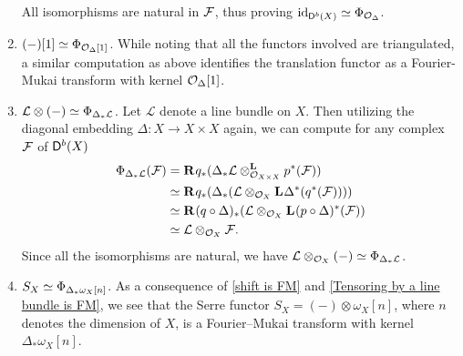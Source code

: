 \begin{example}
\begin{enumerate}[label = (\roman*)]
{    %
    All isomorphisms are natural in $\F$, thus proving $\id{\derb{X}} \iso \fm{\struct{\Delta}}$.
    }
    \item{$(-)[1] \iso \fm{\struct{\Delta}[1]}$. While noting that all the functors involved are triangulated, a similar computation as above identifies the translation functor as a Fourier-Mukai transform with kernel $\struct{\Delta}[1]$.} \label{shift is FM}
    \item{
    $\mathcal L \otimes (-) \iso \fm{\Delta_*\mathcal L}$. Let $\mathcal L$ denote a line bundle on $X$. Then utilizing the diagonal embedding $\Delta \colon X \to X \times X$ again, we can compute for any complex $\F$ of $\derb{X}$
    \begin{align*}
        \fm{{\Delta_*\mathcal L}}(\F) &= \rderived{}{q_*}(\derivedtensor{\Delta_*\mathcal L}{p^*(\F)}{\struct{X \times X}}) \\
        &\iso \rderived{}{q_*}(\Delta_*(\mathcal L \otimes_{\struct{X}}\lderived{}{\Delta^*}({q^*}(\F)))) \\
        &\iso \rderived{}{(q \circ \Delta)_*}(\mathcal L \otimes_{\struct{X}} \lderived{}{(p \circ \Delta)^*}(\F)) \\
        &\iso \mathcal L \otimes_{\struct{X}} \F.
    \end{align*}
    Since all the isomorphisms are natural, we have $\mathcal L \otimes_{\struct{X}} (-) \iso \fm{\Delta_*\mathcal L}$.
    } \label{Tensoring by a line bundle is FM}
    \item{$S_X \iso \fm{\Delta_*\omega_X[n]}$. As a consequence of \ref{shift is FM} and \ref{Tensoring by a line bundle is FM}, we see that the Serre functor $S_X = (-) \otimes \omega_X[n]$, where $n$ denotes the dimension of $X$, is a Fourier--Mukai transform with kernel $\Delta_*\omega_X[n]$. 
}
\end{enumerate}
\end{example}
